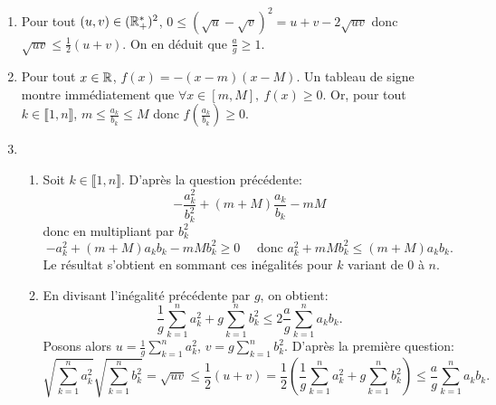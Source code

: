 
\begin{enumerate}
 \item Pour tout $(u, v)\in (\mathbb{R}_{+}^{*})^{2}$, $0\leq (\sqrt{u} - \sqrt{v})^{2} = u + v - 2\sqrt{uv}$ donc $\sqrt{uv}\leq \frac{1}{2}(u+v)$. On en déduit que $\frac{a}{g}\geq 1$.
 
 \item Pour tout $x\in \mathbb{R}$, $f(x) = -(x-m)(x-M)$. Un tableau de signe montre immédiatement que $\forall x\in [m, M],\ f(x) \geq 0$. Or, pour tout $k\in \llbracket 1, n\rrbracket$, $m \leq \frac{a_{k}}{b_{k}} \leq M$ donc
 $f\left ( \frac{a_{k}}{b_{k}}\right ) \geq 0$.
 
 \item \begin{enumerate}
            \item Soit $k\in \llbracket 1, n\rrbracket$. D'après la question précédente:
            \[ - \frac{a_{k}^{2}}{b_{k}^{2}} + (m + M)\frac{a_{k}}{b_{k}} - mM\]
            donc en multipliant par $b_{k}^{2}$ 
            \[ - a_{k}^{2} + (m+ M)a_{k}b_{k} - mM b_{k}^{2} \geq 0 \quad \text{ donc } a_{k}^{2} + mM b_{k}^{2} \leq (m + M) a_{k}b_{k}.\]
            Le résultat s'obtient en sommant ces inégalités pour $k$ variant de $0$ à $n$.
            \item En divisant l'inégalité précédente par $g$, on obtient:
            \[ \frac{1}{g}\sum_{k=1}^{n}a_{k}^{2} + g\sum_{k=1}^{n}b_{k}^{2} \leq 2 \frac{a}{g}\sum_{k=1}^{n}a_{k}b_{k}.\]
            Posons alors $u = \frac{1}{g}\sum_{k=1}^{n}a_{k}^{2}$, $v = g\sum_{k=1}^{n}b_{k}^{2}$. D'après la première question:
            \[ \sqrt{ \sum_{k=1}^{n}a_{k}^{2}} \sqrt{\sum_{k=1}^{n}b_{k}^{2}} = \sqrt{uv} \leq \frac{1}{2}(u+v) = \frac{1}{2}\left ( \frac{1}{g}\sum_{k=1}^{n}a_{k}^{2} + g \sum_{k=1}^{n}b_{k}^{2}\right ) \leq \frac{a}{g}\sum_{k=1}^{n}a_{k}b_{k}.\]
       \end{enumerate}
\end{enumerate}
